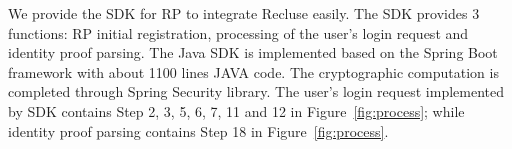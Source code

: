 We provide the SDK for RP to integrate Recluse easily. The SDK provides 3 functions:  RP initial registration, processing of the user's login request and  identity proof parsing. The Java SDK is implemented based on the Spring Boot framework  with about 1100 lines JAVA code. The cryptographic computation is completed through Spring Security library. 
The user's login request implemented by SDK contains Step 2, 3, 5, 6, 7, 11 and 12 in Figure~\ref{fig:process}; while identity proof parsing contains Step 18 in Figure~\ref{fig:process}.

\begin{comment}
\noindent\textbf{Cross-Origin Resource Sharing (CORS).} The chrome extension needs to construct cross-origin requests to communicate with the RP and IdP, which is forbidden by default by the same-origin security policy. Recluse adopts CORS to achieve this cross-origin communication. In details, we requires the RP and IdP to specify \verb+chrome-extension://chrome-id+ in the \verb+Access-Control-Allow-Origin+ field of its response header, which makes the request pass the permission checks at the browser. As \verb+chrome-id+ is unique assigned by the Google, no other (malicious) entity can perform the cross-origin communication.





In this section, we firstly illustrate the parameters requirement in Recluse. After, we describe how the prototype is built.

\subsection{Parameters Requirement}
The $SK_Cert$, $PK_CERT$, $SK_ID$ and $PK_ID$ are two pairs of 2048-bit RSA key for different modulus. The $P$ is the 2048-bit strong prime number, as $(P-1)/2$ is also a prime number. And the $g$ is the smallest primitive root of $P$. The $RPID_O$ is another primitive root of $P$ generated from $g$. The $n_u$, $n_RP$ and $UID$ are required 256-bit odd numbers, which satisfies the security consideration about Discrete Logarithm problem.


\end{comment}
